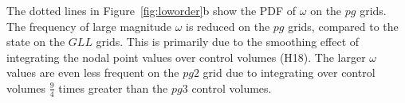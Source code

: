 \documentclass{agujournal}
\begin{document}
The dotted lines in Figure~\ref{fig:loworder}b show the PDF of $\omega$ on the $pg$ grids. The frequency of large magnitude $\omega$ is reduced on the $pg$ grids, compared to the state on the $GLL$ grids. This is primarily due to the smoothing effect of integrating the nodal point values over control volumes (H18). The larger $\omega$ values are even less frequent on the $pg2$ grid due to integrating over control volumes $\frac{9}{4}$ times greater than the $pg3$ control volumes. 


%
%
%
%
%
%
%










%
%
%
%

%
%
%
%
%
%
\end{document}
